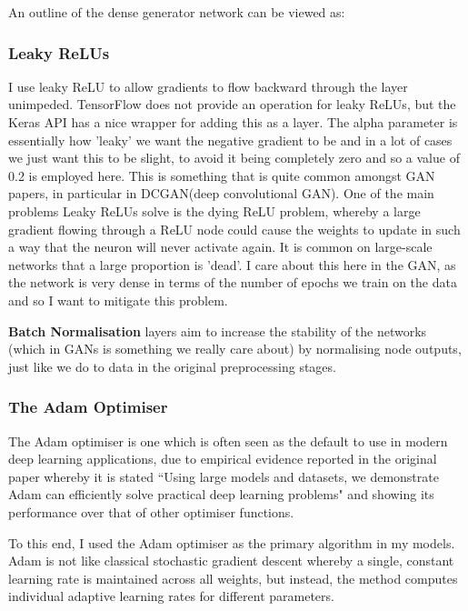\documentclass[12pt,a4paper,twoside]{report}
\begin{document}
An outline of the dense generator network can be viewed as:



\subsubsection{Leaky ReLUs}
I use leaky ReLU to allow gradients to flow backward through the layer unimpeded. TensorFlow does not provide an operation for leaky ReLUs, but the Keras API has a nice wrapper for adding this as a layer. The alpha parameter is essentially how 'leaky' we want the negative gradient to be and in a lot of cases we just want this to be slight, to avoid it being completely zero and so a value of 0.2 is employed here. This is something that is quite common amongst GAN papers, in particular in DCGAN(deep convolutional GAN)\cite{DBLP:journals/corr/RadfordMC15}. One of the main problems Leaky ReLUs solve is the dying ReLU problem, whereby a large gradient flowing through a ReLU node could cause the weights to update in such a way that the neuron will never activate again. It is common on large-scale networks that a large proportion is 'dead'. I care about this here in the GAN, as the network is very dense in terms of the number of epochs we train on the data and so I want to mitigate this problem. 

\textbf{Batch Normalisation} layers aim to increase the stability of the networks (which in GANs is something we really care about) by normalising node outputs, just like we do to data in the original preprocessing stages.

\subsubsection{The Adam Optimiser}
The Adam optimiser is one which is often seen as the default to use in modern deep learning applications, due to empirical evidence reported in the original paper\cite{DBLP:journals/corr/KingmaB14} whereby it is stated ``Using large models and datasets, we demonstrate Adam can efficiently solve practical deep learning problems" and showing its performance over that of other optimiser functions. 

To this end, I used the Adam optimiser as the primary algorithm in my models. Adam is not like classical stochastic gradient descent whereby a single, constant learning rate is maintained across all weights, but instead, the method computes individual adaptive learning rates for different parameters.
\end{document}
